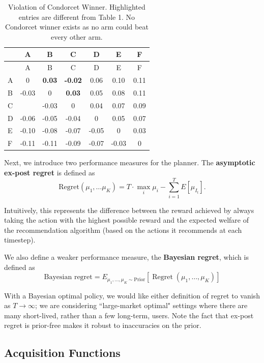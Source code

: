 \documentclass[
  letterpaper,
  DIV=11,
  numbers=noendperiod,
  oneside]{scrreprt}
\theoremstyle{remark}
\begin{document}
\label{fig:condorcet_violation}
\begin{longtable}[]{@{}lcccccc@{}}
\caption{Violation of Condorcet Winner. Highlighted entries are
different from Table 1. No Condorcet winner exists as no arm could beat
every other arm.}\tabularnewline
\toprule\noalign{}
& A & B & C & D & E & F \\
\midrule\noalign{}
\endfirsthead
\toprule\noalign{}
& A & B & C & D & E & F \\
\midrule\noalign{}
\endhead
\bottomrule\noalign{}
\endlastfoot
A & 0 & \textbf{0.03} & \textbf{-0.02} & 0.06 & 0.10 & 0.11 \\
B & -0.03 & 0 & \textbf{0.03} & 0.05 & 0.08 & 0.11 \\
C & & -0.03 & 0 & 0.04 & 0.07 & 0.09 \\
D & -0.06 & -0.05 & -0.04 & 0 & 0.05 & 0.07 \\
E & -0.10 & -0.08 & -0.07 & -0.05 & 0 & 0.03 \\
F & -0.11 & -0.11 & -0.09 & -0.07 & -0.03 & 0 \\
\end{longtable}

Next, we introduce two performance measures for the planner. The
\textbf{asymptotic ex-post regret} is defined as
\[\text{Regret}(\mu_1, \ldots \mu_K) = T\cdot \max_i \mu_i - \sum_{i=1}^T E[\mu_{I_t}].\]

Intuitively, this represents the difference between the reward achieved
by always taking the action with the highest possible reward and the
expected welfare of the recommendation algorithm (based on the actions
it recommends at each timestep).

We also define a weaker performance measure, the \textbf{Bayesian
regret}, which is defined as
\[\text {Bayesian regret}=E_{\mu_1, \ldots, \mu_K \sim \text {Prior}}\left[\operatorname{Regret}\left(\mu_1, \ldots, \mu_K\right)\right]\]

With a Bayesian optimal policy, we would like either definition of
regret to vanish as \(T\to \infty\); we are considering ``large-market
optimal" settings where there are many short-lived, rather than a few
long-term, users. Note the fact that ex-post regret is prior-free makes
it robust to inaccuracies on the prior.

\subsection{Acquisition Functions}\label{acquisition-functions}
\end{document}
